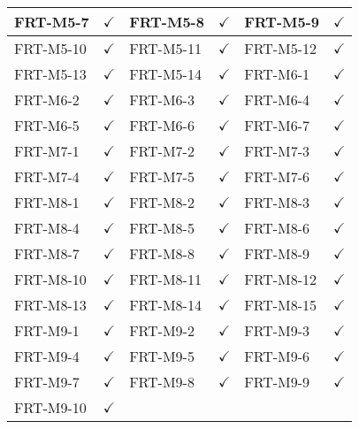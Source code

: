 \documentclass[12pt, titlepage]{article}
\begin{document}
\begin{longtable}{|l|c|l|c|l|c|}
	\midrule
	FRT-M5-7         & $\checkmark$    & FRT-M5-8         & $\checkmark$    & FRT-M5-9         & $\checkmark$    \\
	\midrule
	FRT-M5-10        & $\checkmark$    & FRT-M5-11        & $\checkmark$    & FRT-M5-12        & $\checkmark$    \\
	\midrule
	FRT-M5-13        & $\checkmark$    & FRT-M5-14        & $\checkmark$    & FRT-M6-1         & $\checkmark$    \\
	\midrule
	FRT-M6-2         & $\checkmark$    & FRT-M6-3         & $\checkmark$    & FRT-M6-4         & $\checkmark$    \\
	\midrule
	FRT-M6-5         & $\checkmark$    & FRT-M6-6         & $\checkmark$    & FRT-M6-7         & $\checkmark$    \\
	\midrule
	FRT-M7-1         & $\checkmark$    & FRT-M7-2         & $\checkmark$    & FRT-M7-3         & $\checkmark$    \\
	\midrule
	FRT-M7-4         & $\checkmark$    & FRT-M7-5         & $\checkmark$    & FRT-M7-6         & $\checkmark$    \\
	\midrule
	FRT-M8-1         & $\checkmark$    & FRT-M8-2         & $\checkmark$    & FRT-M8-3         & $\checkmark$    \\
	\midrule
	FRT-M8-4         & $\checkmark$    & FRT-M8-5         & $\checkmark$    & FRT-M8-6         & $\checkmark$    \\
	\midrule
	FRT-M8-7         & $\checkmark$    & FRT-M8-8         & $\checkmark$    & FRT-M8-9         & $\checkmark$    \\
	\midrule
	FRT-M8-10        & $\checkmark$    & FRT-M8-11        & $\checkmark$    & FRT-M8-12        & $\checkmark$    \\
	\midrule
	FRT-M8-13        & $\checkmark$    & FRT-M8-14        & $\checkmark$    & FRT-M8-15        & $\checkmark$    \\
	\midrule
	FRT-M9-1         & $\checkmark$    & FRT-M9-2         & $\checkmark$    & FRT-M9-3         & $\checkmark$    \\
	\midrule
	FRT-M9-4         & $\checkmark$    & FRT-M9-5         & $\checkmark$    & FRT-M9-6         & $\checkmark$    \\
	\midrule
	FRT-M9-7         & $\checkmark$    & FRT-M9-8         & $\checkmark$    & FRT-M9-9         & $\checkmark$    \\
	\midrule
	FRT-M9-10        & $\checkmark$    & ~                & ~               & ~                & ~               \\
	\bottomrule
\end{longtable}
\end{document}
